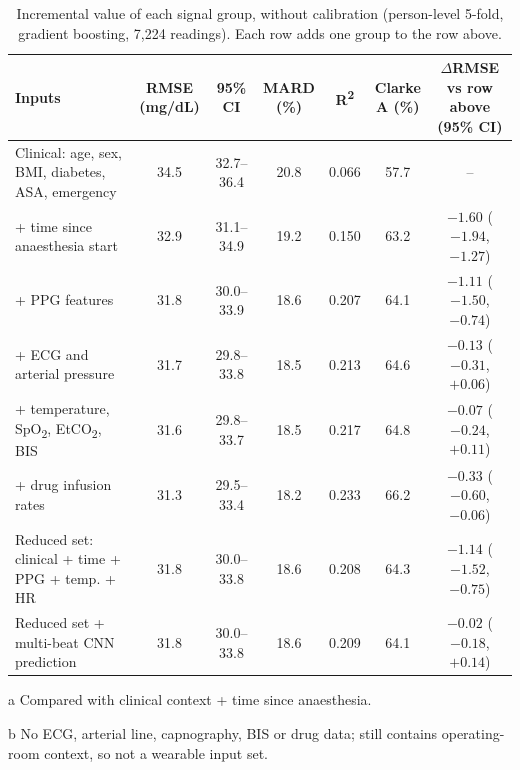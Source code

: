\documentclass[11pt]{article}
\newcommand{\RR}{R\textsuperscript{2}}
\newcommand{\mgdl}{mg/dL}
\begin{document}
\begin{table}[!htbp]
\centering\footnotesize\setlength{\tabcolsep}{3.2pt}
\begin{threeparttable}
\caption{Incremental value of each signal group, without calibration (person-level 5-fold, gradient boosting, 7,224 readings). Each row adds one group to the row above.}
\label{tab:tiers}
\begin{tabular}{@{}lcccccc@{}}
\toprule
Inputs & \makecell{RMSE\\(\mgdl{})} & 95\% CI & \makecell{MARD\\(\%)} & \RR{} & \makecell{Clarke\\A (\%)} & \makecell{$\Delta$RMSE vs row above\\(95\% CI)} \\
\midrule
Clinical: age, sex, BMI, diabetes, ASA, emergency & 34.5 & 32.7--36.4 & 20.8 & 0.066 & 57.7 & -- \\
+ time since anaesthesia start & 32.9 & 31.1--34.9 & 19.2 & 0.150 & 63.2 & $-1.60$ ($-1.94$, $-1.27$) \\
\rowcolor{rowgray} + PPG features & 31.8 & 30.0--33.9 & 18.6 & 0.207 & 64.1 & $-1.11$ ($-1.50$, $-0.74$) \\
+ ECG and arterial pressure & 31.7 & 29.8--33.8 & 18.5 & 0.213 & 64.6 & $-0.13$ ($-0.31$, $+0.06$) \\
+ temperature, SpO\textsubscript{2}, EtCO\textsubscript{2}, BIS & 31.6 & 29.8--33.7 & 18.5 & 0.217 & 64.8 & $-0.07$ ($-0.24$, $+0.11$) \\
+ drug infusion rates & 31.3 & 29.5--33.4 & 18.2 & 0.233 & 66.2 & $-0.33$ ($-0.60$, $-0.06$) \\
\midrule
Reduced set: clinical + time + PPG + temp. + HR\tnote{b} & 31.8 & 30.0--33.8 & 18.6 & 0.208 & 64.3 & $-1.14$ ($-1.52$, $-0.75$)\tnote{a} \\
Reduced set + multi-beat CNN prediction & 31.8 & 30.0--33.8 & 18.6 & 0.209 & 64.1 & $-0.02$ ($-0.18$, $+0.14$) \\
\bottomrule
\end{tabular}
\begin{tablenotes}\footnotesize
\item[a] Compared with clinical context + time since anaesthesia. \item[b] No ECG, arterial line, capnography, BIS or drug data; still contains operating-room context, so not a wearable input set.
\end{tablenotes}
\end{threeparttable}
\end{table}
\end{document}
